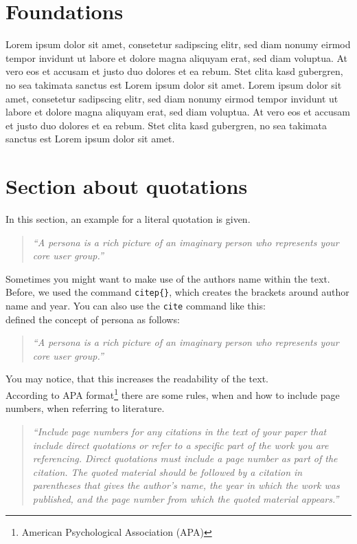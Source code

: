 \documentclass[a4paper]{article}
\begin{document}
\section{Foundations} %
\label{sec:foundations}
Lorem ipsum dolor sit amet, consetetur sadipscing elitr, sed diam nonumy eirmod tempor invidunt ut labore et dolore magna aliquyam erat, sed diam voluptua. At vero eos et accusam et justo duo dolores et ea rebum. Stet clita kasd gubergren, no sea takimata sanctus est Lorem ipsum dolor sit amet. Lorem ipsum dolor sit amet, consetetur sadipscing elitr, sed diam nonumy eirmod tempor invidunt ut labore et dolore magna aliquyam erat, sed diam voluptua. At vero eos et accusam et justo duo dolores et ea rebum. Stet clita kasd gubergren, no sea takimata sanctus est Lorem ipsum dolor sit amet.

\section{Section about quotations} %
\label{sec:section_about_quotations}

In this section, an example for a literal quotation is given. 

\begin{quotation}
	\emph{``A persona is a rich picture of an imaginary person who represents your core user group.''}
	\citep{Dix04}
\end{quotation}

Sometimes you might want to make use of the authors name within the text. Before, we used the command \texttt{citep\{\}}, which creates the brackets around author name and year. You can also use the \texttt{cite} command like this: \\

\cite{Dix04} defined the concept of persona as follows: 
\begin{quotation}
	\emph{``A persona is a rich picture of an imaginary person who represents your core user group.''}
	\citep{Dix04}
\end{quotation}

You may notice, that this increases the readability of the text. \\

According to APA format\footnote{ American Psychological Association (APA)} there are some rules, when and how to include page numbers, when referring to literature. 

\begin{quotation}
	\emph{``Include page numbers for any citations in the text of your paper that include direct quotations or refer to a specific part of the work you are referencing. Direct quotations must include a page number as part of the citation. The quoted material should be followed by a citation in parentheses that gives the author's name, the year in which the work was published, and the page number from which the quoted material appears.''}
	\citep{Hall}
\end{quotation}
\end{document}
